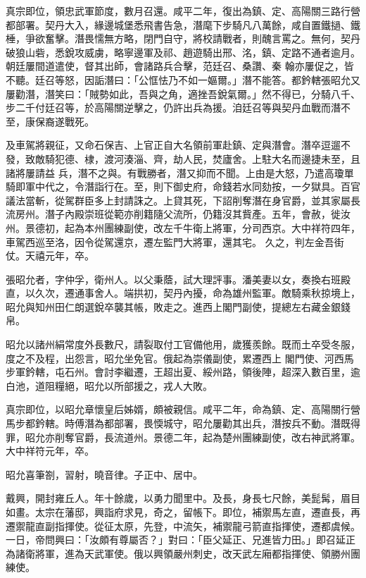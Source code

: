 \begin{pinyinscope}
 真宗即位，領忠武軍節度，數月召還。咸平二年，復出為鎮、定、高陽關三路行營都部署。契丹大入，緣邊城堡悉飛書告急，潛麾下步騎凡八萬餘，咸自置鐵撾、鐵棰，爭欲奮擊。潛畏懦無方略，閉門自守，將校請戰者，則醜言罵之。無何，契丹破狼山砦，悉銳攻威虜，略寧邊軍及祁、趙遊騎出邢、洺，鎮、定路不通者逾月。朝廷屢間道遣使，督其出師，會諸路兵合擊，范廷召、桑讚、秦
 翰亦屢促之，皆不聽。廷召等怒，因詬潛曰：「公恇怯乃不如一嫗爾。」潛不能答。都鈐轄張昭允又屢勸潛，潛笑曰：「賊勢如此，吾與之角，適挫吾銳氣爾。」然不得已，分騎八千、步二千付廷召等，於高陽關逆擊之，仍許出兵為援。洎廷召等與契丹血戰而潛不至，康保裔遂戰死。



 及車駕將親征，又命石保吉、上官正自大名領前軍赴鎮、定與潛會。潛卒逗遛不發，致敵騎犯德、棣，渡河湊淄、齊，劫人民，焚廬舍。上駐大名而邊捷未至，且諸將屢請益
 兵，潛不之與。有戰勝者，潛又抑而不聞。上由是大怒，乃遣高瓊單騎即軍中代之，令潛詣行在。至，則下御史府，命錢若水同劾按，一夕獄具。百官議法當斬，從駕群臣多上封請誅之。上貸其死，下詔削奪潛在身官爵，並其家屬長流房州。潛子內殿崇班從範亦削籍隨父流所，仍籍沒其貲產。五年，會赦，徙汝州。景德初，起為本州團練副使，改左千牛衛上將軍，分司西京。大中祥符四年，車駕西巡至洛，因令從駕還京，遷左監門大將軍，還其宅。
 久之，判左金吾街仗。天禧元年，卒。



 張昭允者，字仲孚，衛州人。以父秉蔭，試大理評事。潘美妻以女，奏換右班殿直，以久次，遷通事舍人。端拱初，契丹內擾，命為雄州監軍。敵騎乘秋掠境上，昭允與知州田仁朗選銳卒襲其帳，敗走之。進西上閣門副使，提總左右藏金銀錢帛。



 昭允以諸州絹常度外長數尺，請裂取付工官備他用，歲獲羨餘。既而土卒受冬服，度之不及程，出怨言，昭允坐免官。俄起為崇儀副使，累遷西上
 閣門使、河西馬步軍鈐轄，屯石州。會討李繼遷，王超出夏、綏州路，領後陣，超深入數百里，逾白池，道阻糧絕，昭允以所部援之，戎人大敗。



 真宗即位，以昭允章懷皇后姊婿，頗被親信。咸平二年，命為鎮、定、高陽關行營馬步都鈐轄。時傅潛為都部署，畏愞城守，昭允屢勸其出兵，潛按兵不動。潛既得罪，昭允亦削奪官爵，長流道州。景德二年，起為楚州團練副使，改右神武將軍。大中祥符元年，卒。



 昭允喜筆劄，習射，曉音律。子正中、居中。



 戴興，開封雍丘人。年十餘歲，以勇力聞里中。及長，身長七尺餘，美髭髯，眉目如畫。太宗在藩邸，興詣府求見，奇之，留帳下。即位，補禦馬左直，遷直長，再遷禦龍直副指揮使。從征太原，先登，中流矢，補禦龍弓箭直指揮使，遷都虞候。一日，帝問興曰：「汝頗有尊屬否？」對曰：「臣父延正、兄進皆力田。」即召延正為諸衛將軍，進為天武軍使。俄以興領嚴州刺史，改天武左廂都指揮使、領勝州團練使。




\end{pinyinscope}
